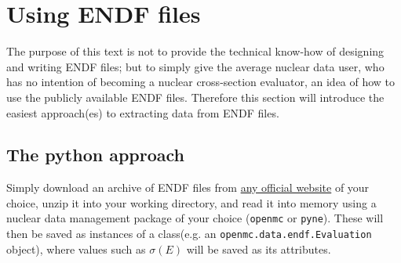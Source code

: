 \documentclass[a4paper, 12pt]{article}
\begin{document}
\section{Using ENDF files}
The purpose of this text is not to provide the technical know-how of designing and writing ENDF files; but to simply give the average nuclear data user, who has no intention of becoming a nuclear cross-section evaluator, an idea of how to use the publicly available ENDF files. Therefore this section will introduce the easiest approach(es) to extracting data from ENDF files.

\subsection{The python approach}
Simply download an archive of ENDF files from \href{https://www-nds.iaea.org/public/download-endf}{any official website} of your choice, unzip it  into your working directory, and read it into memory using a nuclear data management package of your choice (\texttt{openmc} or \texttt{pyne}). These will then be saved as instances of a class(e.g. an \verb|openmc.data.endf.Evaluation|
object), where values such as $\sigma(E)$ will be saved as its attributes.



\end{document}
